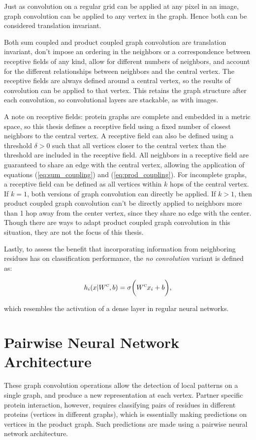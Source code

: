 Just as convolution on a regular grid can be applied at any pixel in an image, graph convolution can be applied to any vertex in the graph.
Hence both can be considered translation invariant.

Both sum coupled and product coupled graph convolution are translation invariant, don't impose an ordering in the neighbors or a correspondence between receptive fields of any kind, allow for different numbers of neighbors, and account for the different relationships between neighbors and the central vertex. 
The receptive fields are always defined around a central vertex, so the results of convolution can be applied to that vertex.
This retains the graph structure after each convolution, so convolutional layers are stackable, as with images.

A note on receptive fields: protein graphs are complete and embedded in a metric space, so this thesis defines a receptive field using a fixed number of closest neighbors to the central vertex.
A receptive field can also be defined using a threshold $\delta>0$ such that all vertices closer to the central vertex than the threshold are included in the receptive field.
All neighbors in a receptive field are guaranteed to share an edge with the central vertex, allowing the application of equations (\ref{eq:sum_coupling}) and (\ref{eq:prod_coupling}).
For incomplete graphs, a receptive field can be defined as all vertices within $k$ hops of the central vertex. 
If $k=1$, both versions of graph convolution can directly be applied.
If $k>1$, then product coupled graph convolution can't be directly applied to neighbors more than 1 hop away from the center vertex, since they share no edge with the center. 
Though there are ways to adapt product coupled graph convolution in this situation, they are not the focus of this thesis.

Lastly, to assess the benefit that incorporating information from neighboring residues has on classification performance, the \emph{no convolution} variant is defined as:

\begin{equation}
h_i(x | W^\textsc{c}, b)= \sigma \bigg( W^{\textsc{c}} x_i + b \bigg),
\label{eq:no_conv}
\end{equation}

which resembles the activation of a dense layer in regular neural networks.


\section{Pairwise Neural Network Architecture}
These graph convolution operations allow the detection of local patterns on a single graph, and produce a new representation at each vertex.
Partner specific protein interaction, however, requires classifying pairs of residues in different proteins (vertices in different graphs), which is essentially making predictions on vertices in the product graph. 
Such predictions are made using a pairwise neural network architecture.

